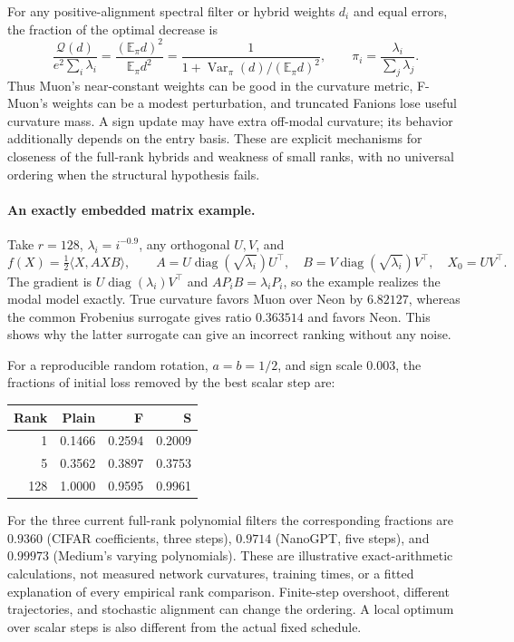 \documentclass[11pt]{article}
\newcommand{\E}{\mathbb E}
\newcommand{\ip}[2]{\langle #1,#2\rangle}
\begin{document}
For any positive-alignment spectral filter or hybrid weights $d_i$ and
equal errors, the fraction of the optimal decrease is
\begin{equation}\label{eq:cv}
 \frac{\mathcal Q(d)}{e^2\sum_i\lambda_i}
 =\frac{(\E_\pi d)^2}{\E_\pi d^2}
 =\frac{1}{1+\operatorname{Var}_\pi(d)/(\E_\pi d)^2},
 \qquad \pi_i=\frac{\lambda_i}{\sum_j\lambda_j}.
\end{equation}
Thus Muon's near-constant weights can be good in the curvature metric,
F-Muon's weights can be a modest perturbation, and truncated Fanions lose
useful curvature mass. A sign update may have extra off-modal curvature;
its behavior additionally depends on the entry basis. These are explicit
mechanisms for closeness of the full-rank hybrids and weakness of small
ranks, with no universal ordering when the structural hypothesis fails.

\paragraph{An exactly embedded matrix example.}
Take $r=128$, $\lambda_i=i^{-0.9}$, any orthogonal $U,V$, and
\begin{equation}\label{eq:embedded-example}
 f(X)=\tfrac12\ip{X}{AXB},\qquad
 A=U\operatorname{diag}(\sqrt{\lambda_i})U^\top,\quad
 B=V\operatorname{diag}(\sqrt{\lambda_i})V^\top,\quad X_0=UV^\top.
\end{equation}
The gradient is $U\operatorname{diag}(\lambda_i)V^\top$ and
$AP_iB=\lambda_iP_i$, so the example realizes the modal model exactly.
True curvature favors Muon over Neon by $6.82127$, whereas the common
Frobenius surrogate gives ratio $0.363514$ and favors Neon. This shows why
the latter surrogate can give an incorrect ranking without any noise.

For a reproducible random rotation, $a=b=1/2$, and sign scale $0.003$,
the fractions of initial loss removed by the best scalar step are:
\begin{center}
\begin{tabular}{rrrr}
\toprule
Rank & Plain & F & S\\
\midrule
1 & 0.1466 & 0.2594 & 0.2009\\
5 & 0.3562 & 0.3897 & 0.3753\\
128 & 1.0000 & 0.9595 & 0.9961\\
\bottomrule
\end{tabular}
\end{center}
For the three current full-rank polynomial filters the corresponding
fractions are $0.9360$ (CIFAR coefficients, three steps), $0.9714$
(NanoGPT, five steps), and $0.99973$ (Medium's varying polynomials).
These are illustrative exact-arithmetic calculations, not measured network
curvatures, training times, or a fitted explanation of every empirical rank
comparison. Finite-step overshoot, different trajectories, and stochastic
alignment can change the ordering. A local optimum over scalar steps is
also different from the actual fixed schedule.
\end{document}
